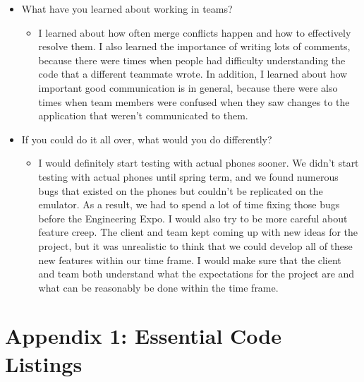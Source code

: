 \documentclass[onecolumn, draftclsnofoot,10pt, compsoc]{IEEEtran}
\begin{document}
\begin{itemize}
\begin{itemize}
     \end{itemize}
     \item What have you learned about working in teams?
     \begin{itemize}
         \item I learned about how often merge conflicts happen and how to effectively resolve them. I also learned the importance of writing lots of comments, because there were times when people had difficulty understanding the code that a different teammate wrote. In addition, I learned about how important good communication is in general, because there were also times when team members were confused when they saw changes to the application that weren't communicated to them.
     \end{itemize}
     \item If you could do it all over, what would you do differently?
     \begin{itemize}
         \item I would definitely start testing with actual phones sooner. We didn't start testing with actual phones until spring term, and we found numerous bugs that existed on the phones but couldn't be replicated on the emulator. As a result, we had to spend a lot of time fixing those bugs before the Engineering Expo. I would also try to be more careful about feature creep. The client and team kept coming up with new ideas for the project, but it was unrealistic to think that we could develop all of these new features within our time frame. I would make sure that the client and team both understand what the expectations for the project are and what can be reasonably be done within the time frame. 
     \end{itemize}
 \end{itemize}
 \section{Appendix 1: Essential Code Listings}
 
\end{document}
